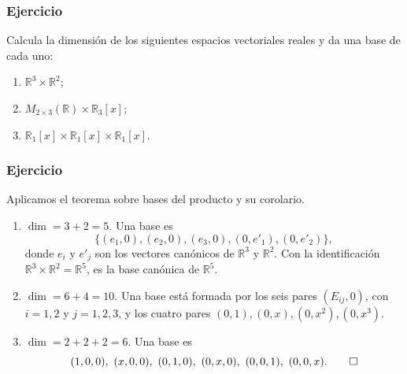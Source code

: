 \begin{frame}
    \frametitle{Ejercicio}

    \begin{exercise}
        Calcula la dimensión de los siguientes espacios vectoriales
        reales y da una base de cada uno:
        \begin{enumerate}
            \item $\mathbb{R}^3\times\mathbb{R}^2$;
            \item $M_{2\times3}(\mathbb{R})\times\mathbb{R}_3[x]$;
            \item $\mathbb{R}_1[x]\times\mathbb{R}_1[x]\times\mathbb{R}_1[x]$.
        \end{enumerate}
    \end{exercise}
\end{frame}


\begin{frame}[allowframebreaks]
    \frametitle{Ejercicio}

    \begin{solution}
        Aplicamos el teorema sobre bases del producto y su corolario.

        \begin{enumerate}
            \item $\dim=3+2=5$. Una base es
                  \[
                      \{(e_1,0),(e_2,0),(e_3,0),(0,e'_1),(0,e'_2)\},
                  \]
                  donde $e_i$ y $e'_j$ son los vectores canónicos de
                  $\mathbb{R}^3$ y $\mathbb{R}^2$. Con la identificación
                  $\mathbb{R}^3\times\mathbb{R}^2=\mathbb{R}^5$, es la base
                  canónica de $\mathbb{R}^5$.

            \item $\dim=6+4=10$. Una base está formada por los seis pares
                  $(E_{ij},0)$, con $i=1,2$ y $j=1,2,3$, y los cuatro pares
                  $(0,1),(0,x),(0,x^2),(0,x^3)$.

            \item $\dim=2+2+2=6$. Una base es
                  \[
                      (1,0,0),\ (x,0,0),\ (0,1,0),\ (0,x,0),\ (0,0,1),\ (0,0,x).\qedhere
                  \]
        \end{enumerate}
    \end{solution}
\end{frame}



